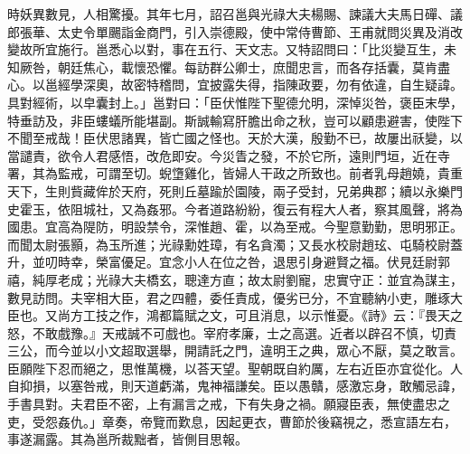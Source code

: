 \begin{pinyinscope}
時妖異數見，人相驚擾。其年七月，詔召邕與光祿大夫楊賜、諫議大夫馬日磾、議郎張華、太史令單颺詣金商門，引入崇德殿，使中常侍曹節、王甫就問災異及消改變故所宜施行。邕悉心以對，事在五行、天文志。又特詔問曰：「比災變互生，未知厥咎，朝廷焦心，載懷恐懼。每訪群公卿士，庶聞忠言，而各存括囊，莫肯盡心。以邕經學深奧，故密特稽問，宜披露失得，指陳政要，勿有依違，自生疑諱。具對經術，以皁囊封上。」邕對曰：「臣伏惟陛下聖德允明，深悼災咎，褒臣末學，特垂訪及，非臣螻蟻所能堪副。斯誠輸寫肝膽出命之秋，豈可以顧患避害，使陛下不聞至戒哉！臣伏思諸異，皆亡國之怪也。天於大漢，殷勤不已，故屢出祅變，以當譴責，欲令人君感悟，改危即安。今災眚之發，不於它所，遠則門垣，近在寺署，其為監戒，可謂至切。蜺墯雞化，皆婦人干政之所致也。前者乳母趙嬈，貴重天下，生則貲藏侔於天府，死則丘墓踰於園陵，兩子受封，兄弟典郡；續以永樂門史霍玉，依阻城社，又為姦邪。今者道路紛紛，復云有程大人者，察其風聲，將為國患。宜高為隄防，明設禁令，深惟趙、霍，以為至戒。今聖意勤勤，思明邪正。而聞太尉張顥，為玉所進；光祿勳姓璋，有名貪濁；又長水校尉趙玹、屯騎校尉蓋升，並叨時幸，榮富優足。宜念小人在位之咎，退思引身避賢之福。伏見廷尉郭禧，純厚老成；光祿大夫橋玄，聰達方直；故太尉劉寵，忠實守正：並宜為謀主，數見訪問。夫宰相大臣，君之四體，委任責成，優劣已分，不宜聽納小吏，雕琢大臣也。又尚方工技之作，鴻都篇賦之文，可且消息，以示惟憂。《詩》云：『畏天之怒，不敢戲豫。』天戒誠不可戲也。宰府孝廉，士之高選。近者以辟召不慎，切責三公，而今並以小文超取選舉，開請託之門，違明王之典，眾心不厭，莫之敢言。臣願陛下忍而絕之，思惟萬機，以荅天望。聖朝既自約厲，左右近臣亦宜從化。人自抑損，以塞咎戒，則天道虧滿，鬼神福謙矣。臣以愚贛，感激忘身，敢觸忌諱，手書具對。夫君臣不密，上有漏言之戒，下有失身之禍。願寢臣表，無使盡忠之吏，受怨姦仇。」章奏，帝覽而歎息，因起更衣，曹節於後竊視之，悉宣語左右，事遂漏露。其為邕所裁黜者，皆側目思報。


\end{pinyinscope}
